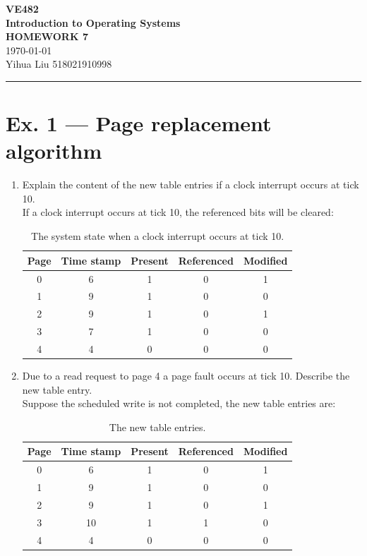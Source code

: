 \documentclass[a4paper]{article}
\begin{document}
\begin{center}
    \huge
    \textbf{VE482\\Introduction to Operating Systems\\}
    \Large
    \vspace{15pt}
    \uppercase{\textbf{Homework 7}}\\
    \large
    \vspace{5pt}\today\\
    \vspace{5pt}
    Yihua Liu 518021910998
    \vspace{5pt}
    \rule[-5pt]{.97\linewidth}{0.05em}
\end{center}
\section*{Ex. 1 — Page replacement algorithm}
\begin{enumerate}
    \item Explain the content of the new table entries if a clock interrupt occurs at tick 10.\\
    If a clock interrupt occurs at tick 10, the referenced bits will be cleared:
    \begin{table}[H]
        \centering
        \begin{tabular}{ccccc}
            \toprule
            Page&Time stamp&Present&Referenced&Modified\\
            \midrule
            0&6&1&0&1\\
            1&9&1&0&0\\
            2&9&1&0&1\\
            3&7&1&0&0\\
            4&4&0&0&0\\
            \bottomrule
        \end{tabular}
        \caption{The system state when a clock interrupt occurs at tick 10.}
    \end{table}
    \item Due to a read request to page 4 a page fault occurs at tick 10. Describe the new table entry.\\
    Suppose the scheduled write is not completed, the new table entries are:
    \begin{table}[H]
        \centering
        \begin{tabular}{ccccc}
            \toprule
            Page&Time stamp&Present&Referenced&Modified\\
            \midrule
            0&6&1&0&1\\
            1&9&1&0&0\\
            2&9&1&0&1\\
            3&10&1&1&0\\
            4&4&0&0&0\\
            \bottomrule
        \end{tabular}
        \caption{The new table entries.}
    \end{table}
\end{enumerate}
\end{document}
